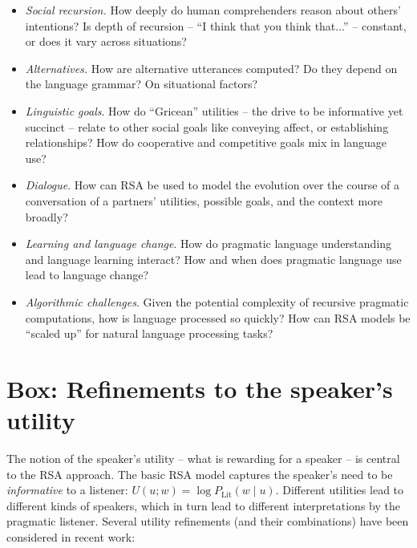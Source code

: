 \documentclass[]{elsarticle}
\begin{document}
\begin{itemize}
\item \emph{Social recursion.} How deeply do human comprehenders reason about others' intentions? Is depth of recursion -- ``I think that you think that...'' -- constant, or does it vary across situations? 
  
\item \emph{Alternatives.} How are alternative utterances computed? Do they depend on the language grammar? On situational factors?

%
\item \emph{Linguistic goals}. How do ``Gricean'' utilities -- the drive to be informative yet succinct -- relate to other social goals like conveying affect, or establishing relationships? How do cooperative and competitive goals mix in language use?

\item \emph{Dialogue}. How can RSA be used to model the evolution over the course of a conversation of a partners' utilities, possible goals, and the context more broadly?

 \item \emph{Learning and language change}. How do pragmatic language understanding and language learning interact? How and when does pragmatic language use lead to language change?

\item \emph{Algorithmic challenges}. Given the potential complexity of
recursive pragmatic computations, how is language processed so quickly? How can RSA models be ``scaled up'' for natural language
  processing tasks?
%

\end{itemize}

\section{Box: Refinements to the speaker's utility}\label{box-refinements-to-the-speakers-utility}

The notion of the speaker's utility -- what is rewarding for a speaker -- is central to the RSA approach. The basic RSA model captures the speaker's need to be \emph{informative} to a listener: $U(u; w) = \log P_{\text{Lit}}(w\mid u)$. Different utilities lead to different kinds of
speakers, which in turn lead to different interpretations by the pragmatic
listener. Several utility refinements (and their combinations) have been
considered in recent work:
\end{document}
